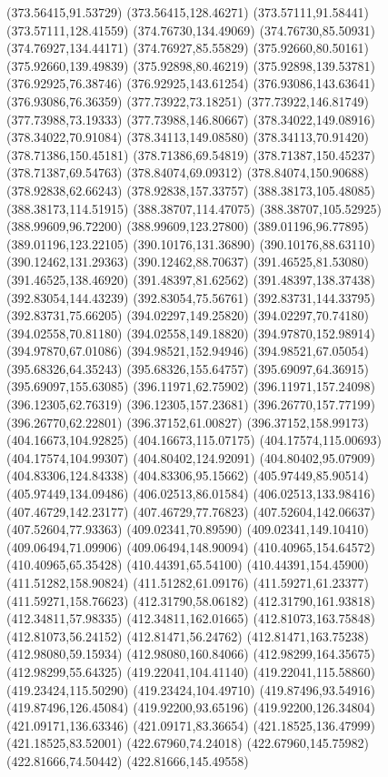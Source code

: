 {(373.56415,91.53729) (373.56415,128.46271) (373.57111,91.58441) (373.57111,128.41559) (374.76730,134.49069) (374.76730,85.50931) (374.76927,134.44171) (374.76927,85.55829)
(375.92660,80.50161) (375.92660,139.49839) (375.92898,80.46219) (375.92898,139.53781) (376.92925,76.38746) (376.92925,143.61254) (376.93086,143.63641) (376.93086,76.36359)
(377.73922,73.18251) (377.73922,146.81749) (377.73988,73.19333) (377.73988,146.80667) (378.34022,149.08916) (378.34022,70.91084) (378.34113,149.08580) (378.34113,70.91420)
(378.71386,150.45181) (378.71386,69.54819) (378.71387,150.45237) (378.71387,69.54763) (378.84074,69.09312) (378.84074,150.90688) (378.92838,62.66243) (378.92838,157.33757)
(388.38173,105.48085) (388.38173,114.51915) (388.38707,114.47075) (388.38707,105.52925) (388.99609,96.72200) (388.99609,123.27800) (389.01196,96.77895) (389.01196,123.22105)
(390.10176,131.36890) (390.10176,88.63110) (390.12462,131.29363) (390.12462,88.70637) (391.46525,81.53080) (391.46525,138.46920) (391.48397,81.62562) (391.48397,138.37438)
(392.83054,144.43239) (392.83054,75.56761) (392.83731,144.33795) (392.83731,75.66205) (394.02297,149.25820) (394.02297,70.74180) (394.02558,70.81180) (394.02558,149.18820)
(394.97870,152.98914) (394.97870,67.01086) (394.98521,152.94946) (394.98521,67.05054) (395.68326,64.35243) (395.68326,155.64757) (395.69097,64.36915) (395.69097,155.63085)
(396.11971,62.75902) (396.11971,157.24098) (396.12305,62.76319) (396.12305,157.23681) (396.26770,157.77199) (396.26770,62.22801) (396.37152,61.00827) (396.37152,158.99173)
(404.16673,104.92825) (404.16673,115.07175) (404.17574,115.00693) (404.17574,104.99307) (404.80402,124.92091) (404.80402,95.07909) (404.83306,124.84338) (404.83306,95.15662)
(405.97449,85.90514) (405.97449,134.09486) (406.02513,86.01584) (406.02513,133.98416) (407.46729,142.23177) (407.46729,77.76823) (407.52604,142.06637) (407.52604,77.93363)
(409.02341,70.89590) (409.02341,149.10410) (409.06494,71.09906) (409.06494,148.90094) (410.40965,154.64572) (410.40965,65.35428) (410.44391,65.54100) (410.44391,154.45900)
(411.51282,158.90824) (411.51282,61.09176) (411.59271,61.23377) (411.59271,158.76623) (412.31790,58.06182) (412.31790,161.93818) (412.34811,57.98335) (412.34811,162.01665)
(412.81073,163.75848) (412.81073,56.24152) (412.81471,56.24762) (412.81471,163.75238) (412.98080,59.15934) (412.98080,160.84066) (412.98299,164.35675) (412.98299,55.64325)
(419.22041,104.41140) (419.22041,115.58860) (419.23424,115.50290) (419.23424,104.49710) (419.87496,93.54916) (419.87496,126.45084) (419.92200,93.65196) (419.92200,126.34804)
(421.09171,136.63346) (421.09171,83.36654) (421.18525,136.47999) (421.18525,83.52001) (422.67960,74.24018) (422.67960,145.75982) (422.81666,74.50442) (422.81666,145.49558)
}
